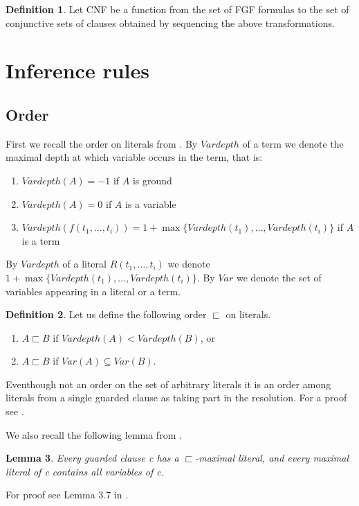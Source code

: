 \documentclass[english, shortabstract]{iithesis}
\theoremstyle{definition} \newtheorem{definition}{Definition}[chapter]
\theoremstyle{remark} \newtheorem{remark}[definition]{Observation}
\theoremstyle{plain} \newtheorem{theorem}[definition]{Theorem}
\theoremstyle{plain} \newtheorem{lemma}[definition]{Lemma}
\begin{document}
\begin{definition}
Let CNF be a function from the set of FGF formulas to the set of conjunctive sets of clauses obtained by sequencing the above transformations.
\end{definition}

\section{Inference rules}\label{section:inference}

\subsection{Order}

First we recall the order on literals from \cite{resolution gf}.
By $\mathit{Vardepth}$ of a term we denote the maximal depth at which variable occurs in the term, that is:
\begin{enumerate}
    \item $\mathit{Vardepth}(A)=-1$ if $A$ is ground
    \item $\mathit{Vardepth}(A)=0$ if $A$ is a variable
    \item $\mathit{Vardepth}(f(t_1,\dots, t_i))=1+\max\{\mathit{Vardepth}(t_1), \dots, \mathit{Vardepth}(t_i)\}$ if $A$ is a term
\end{enumerate}
By $\mathit{Vardepth}$ of a literal $R(t_1, \dots, t_i)$ we denote $1+\max\{\mathit{Vardepth}(t_1), \dots, \mathit{Vardepth}(t_i)\}$.
By $\mathit{Var}$ we denote the set of variables appearing in a literal or a term.
\begin{definition}\label{def:order}
Let us define the following order $\sqsubset$ on literals.
\begin{enumerate}
    \item $A \sqsubset B$ if $Vardepth(A) < Vardepth(B)$, or
    \item $A \sqsubset B$ if $\mathit{Var}(A) \subseteq Var(B)$.
\end{enumerate}
\end{definition}
Eventhough not an order on the set of arbitrary literals it is an order among literals from a single guarded clause as taking part in the resolution.
For a proof see \cite{resolution gf}.

We also recall the following lemma from \cite{resolution GF}.
\begin{lemma}\label{lem:guarded}
Every guarded clause c has a $\sqsubset$-maximal literal, and every maximal literal
of c contains all variables of c.
\end{lemma}
For proof see Lemma 3.7 in \cite{resolution GF}.
\end{document}
